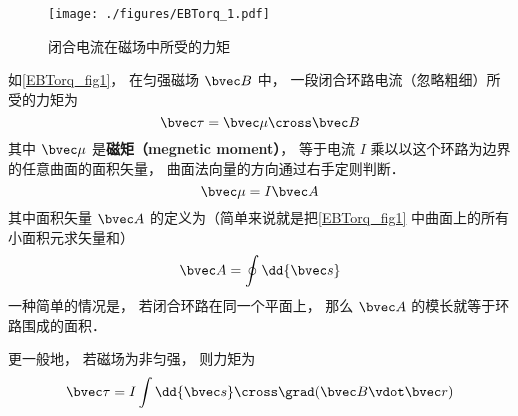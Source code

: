 
\begin{figure}[ht]
\centering
\texttt{[image: ./figures/EBTorq\_1.pdf]}
\caption{闭合电流在磁场中所受的力矩} \label{EBTorq_fig1}
\end{figure}

如\autoref{EBTorq_fig1}， 在匀强磁场 $\bvec B$ 中， 一段闭合环路电流（忽略粗细）所受的力矩为
\begin{equation}\label{EBTorq_eq2}
\bvec \tau = \bvec \mu \cross \bvec B
\end{equation}
其中 $\bvec \mu$ 是\textbf{磁矩（megnetic moment）}， 等于电流 $I$ 乘以以这个环路为边界的任意曲面的面积矢量， 曲面法向量的方向通过右手定则判断．
\begin{equation}
\bvec \mu = I \bvec A
\end{equation}
其中面积矢量 $\bvec A$ 的定义为（简单来说就是把\autoref{EBTorq_fig1} 中曲面上的所有小面积元求矢量和）
\begin{equation}
\bvec A = \oint \dd{\bvec s}
\end{equation}
一种简单的情况是， 若闭合环路在同一个平面上， 那么 $\bvec A$ 的模长就等于环路围成的面积．

更一般地， 若磁场为非匀强， 则力矩为
\begin{equation}\label{EBTorq_eq1}
\bvec \tau = I \int \dd{\bvec s}\cross\grad(\bvec B\vdot\bvec r)
\end{equation}

